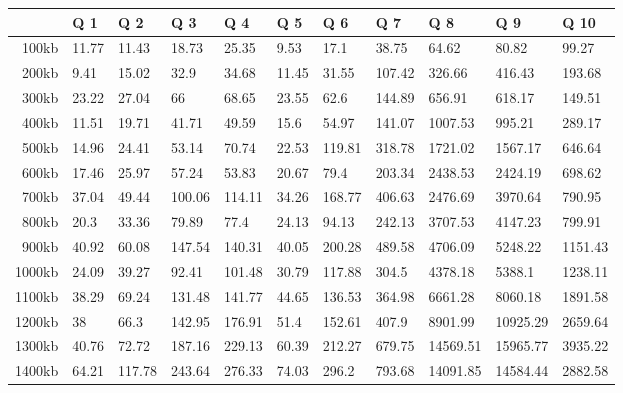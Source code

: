 
\begin {table}[htpb]
\centering
\hspace*{-1.5cm}\begin{tabular}{r|l|l|l|l|l|l|l|l|l|l}
&Q 1&Q 2&Q 3&Q 4&Q 5&Q 6&Q 7&Q 8&Q 9&Q 10\\
\hline
100kb&11.77&11.43&18.73&25.35&9.53&17.1&38.75&64.62&80.82&99.27\\
200kb&9.41&15.02&32.9&34.68&11.45&31.55&107.42&326.66&416.43&193.68\\
300kb&23.22&27.04&66&68.65&23.55&62.6&144.89&656.91&618.17&149.51\\
400kb&11.51&19.71&41.71&49.59&15.6&54.97&141.07&1007.53&995.21&289.17\\
500kb&14.96&24.41&53.14&70.74&22.53&119.81&318.78&1721.02&1567.17&646.64\\
600kb&17.46&25.97&57.24&53.83&20.67&79.4&203.34&2438.53&2424.19&698.62\\
700kb&37.04&49.44&100.06&114.11&34.26&168.77&406.63&2476.69&3970.64&790.95\\
800kb&20.3&33.36&79.89&77.4&24.13&94.13&242.13&3707.53&4147.23&799.91\\
900kb&40.92&60.08&147.54&140.31&40.05&200.28&489.58&4706.09&5248.22&1151.43\\
1000kb&24.09&39.27&92.41&101.48&30.79&117.88&304.5&4378.18&5388.1&1238.11\\
1100kb&38.29&69.24&131.48&141.77&44.65&136.53&364.98&6661.28&8060.18&1891.58\\
1200kb&38&66.3&142.95&176.91&51.4&152.61&407.9&8901.99&10925.29&2659.64\\
1300kb&40.76&72.72&187.16&229.13&60.39&212.27&679.75&14569.51&15965.77&3935.22\\
1400kb&64.21&117.78&243.64&276.33&74.03&296.2&793.68&14091.85&14584.44&2882.58\\


\end{tabular}
\end{table}
